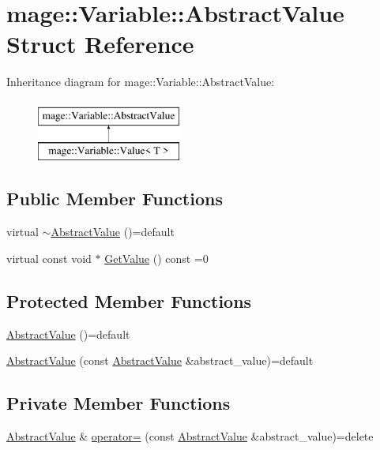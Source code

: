 \hypertarget{structmage_1_1_variable_1_1_abstract_value}{}\section{mage\+:\+:Variable\+:\+:Abstract\+Value Struct Reference}
\label{structmage_1_1_variable_1_1_abstract_value}
Inheritance diagram for mage\+:\+:Variable\+:\+:Abstract\+Value\+:\begin{figure}[H]
\begin{center}
\leavevmode
\includegraphics[height=2.000000cm]{structmage_1_1_variable_1_1_abstract_value}
\end{center}
\end{figure}
\subsection*{Public Member Functions}
\begin{DoxyCompactItemize}
\item 
virtual \hyperlink{structmage_1_1_variable_1_1_abstract_value_a7fa8fc14f81bb26f239af5f1263888a5}{$\sim$\+Abstract\+Value} ()=default
\item 
virtual const void $\ast$ \hyperlink{structmage_1_1_variable_1_1_abstract_value_aede2a77b571b80794a4254e34144f4c1}{Get\+Value} () const =0
\end{DoxyCompactItemize}
\subsection*{Protected Member Functions}
\begin{DoxyCompactItemize}
\item 
\hyperlink{structmage_1_1_variable_1_1_abstract_value_a0a96662d36697af8a17b88f6a2d8efca}{Abstract\+Value} ()=default
\item 
\hyperlink{structmage_1_1_variable_1_1_abstract_value_a09123ab568948a1a8bc7911c65fda422}{Abstract\+Value} (const \hyperlink{structmage_1_1_variable_1_1_abstract_value}{Abstract\+Value} \&abstract\+\_\+value)=default
\end{DoxyCompactItemize}
\subsection*{Private Member Functions}
\begin{DoxyCompactItemize}
\item 
\hyperlink{structmage_1_1_variable_1_1_abstract_value}{Abstract\+Value} \& \hyperlink{structmage_1_1_variable_1_1_abstract_value_a77f7107e78716a0ea76cfaedd0a50a4b}{operator=} (const \hyperlink{structmage_1_1_variable_1_1_abstract_value}{Abstract\+Value} \&abstract\+\_\+value)=delete
\end{DoxyCompactItemize}


